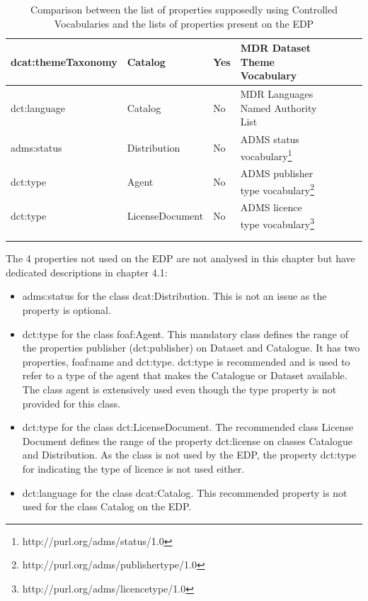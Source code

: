 \documentclass[<options>]{elsarticle}
\begin{document}
\begin{longtable}{*8l}
\rowcolor{gray!10} dcat:themeTaxonomy&Catalog &Yes &MDR Dataset Theme Vocabulary \\ \hline
\rowcolor{gray!10} dct:language &Catalog &No &MDR Languages Named Authority List \\ \hline
\rowcolor{gray!10} adms:status &Distribution &No &ADMS status vocabulary\footnote{http://purl.org/adms/status/1.0} \\ \hline
\rowcolor{gray!10} dct:type &Agent &No &ADMS publisher type vocabulary\footnote{http://purl.org/adms/publishertype/1.0} \\ \hline
\rowcolor{gray!10} dct:type &LicenseDocument &No &ADMS licence type vocabulary\footnote{http://purl.org/adms/licencetype/1.0} \\ \hline

\\ 
\caption{Comparison between the list of properties supposedly using Controlled Vocabularies and the lists of properties present on the EDP}
\end{longtable}

The 4 properties not used on the EDP are not analysed in this chapter but have dedicated descriptions in chapter 4.1:

\begin{itemize}
\item adms:status for the class dcat:Distribution. This is not an issue as the property is optional.
\item dct:type for the class foaf:Agent. This mandatory class defines the range of the properties publisher (dct:publisher) on Dataset and Catalogue. It has two properties, foaf:name and dct:type. dct:type is recommended and is used to refer to a type of the agent that makes the Catalogue or Dataset available. The class agent is extensively used even though the type property is not provided for this class.
\item dct:type for the class dct:LicenseDocument. The recommended class License Document defines the range of the property dct:license on classes Catalogue and Distribution. As the class is not used by the EDP, the property dct:type for indicating the type of licence is not used either.
\item dct:language for the class dcat:Catalog. This recommended property is not used for the class Catalog on the EDP.
\end{itemize}
\end{document}
